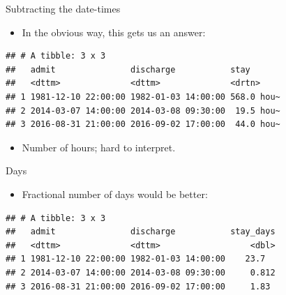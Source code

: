 \documentclass[
  ignorenonframetext,
]{beamer}
\newenvironment{Shaded}{\begin{snugshade}}{\end{snugshade}}
\newcommand{\CommentTok}[1]{\textcolor[rgb]{0.56,0.35,0.01}{\textit{#1}}}
\newcommand{\DataTypeTok}[1]{\textcolor[rgb]{0.13,0.29,0.53}{#1}}
\newcommand{\DecValTok}[1]{\textcolor[rgb]{0.00,0.00,0.81}{#1}}
\newcommand{\KeywordTok}[1]{\textcolor[rgb]{0.13,0.29,0.53}{\textbf{#1}}}
\newcommand{\NormalTok}[1]{#1}
\newcommand{\OperatorTok}[1]{\textcolor[rgb]{0.81,0.36,0.00}{\textbf{#1}}}
\newcommand{\StringTok}[1]{\textcolor[rgb]{0.31,0.60,0.02}{#1}}
\providecommand{\tightlist}{%
  \setlength{\itemsep}{0pt}\setlength{\parskip}{0pt}}
\begin{document}
\begin{frame}[fragile]{Subtracting the date-times}
\protect\hypertarget{subtracting-the-date-times}{}

\begin{itemize}
\tightlist
\item
  In the obvious way, this gets us an answer:
\end{itemize}

\begin{Shaded}
\end{Shaded}

\begin{verbatim}
## # A tibble: 3 x 3
##   admit               discharge           stay      
##   <dttm>              <dttm>              <drtn>    
## 1 1981-12-10 22:00:00 1982-01-03 14:00:00 568.0 hou~
## 2 2014-03-07 14:00:00 2014-03-08 09:30:00  19.5 hou~
## 3 2016-08-31 21:00:00 2016-09-02 17:00:00  44.0 hou~
\end{verbatim}

\begin{itemize}
\tightlist
\item
  Number of hours; hard to interpret.
\end{itemize}

\end{frame}

\begin{frame}[fragile]{Days}
\protect\hypertarget{days}{}

\begin{itemize}
\tightlist
\item
  Fractional number of days would be better:
\end{itemize}

\begin{Shaded}
\end{Shaded}

\begin{verbatim}
## # A tibble: 3 x 3
##   admit               discharge           stay_days
##   <dttm>              <dttm>                  <dbl>
## 1 1981-12-10 22:00:00 1982-01-03 14:00:00    23.7  
## 2 2014-03-07 14:00:00 2014-03-08 09:30:00     0.812
## 3 2016-08-31 21:00:00 2016-09-02 17:00:00     1.83
\end{verbatim}

\end{frame}
\end{document}
